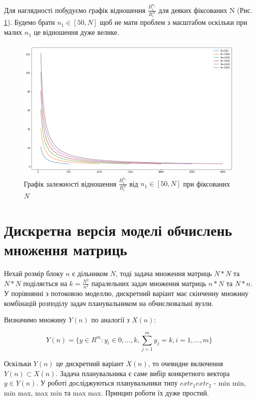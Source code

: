 Для наглядності побудуємо графік відношення $\frac{B_i^{n_1}}{B_i^{N}}$ для деяких фіксованих N (Рис. \ref{fig:frac_from_n}). Будемо брати $n_1 \in [50, N]$ щоб не мати проблем з масштабом оскільки при малих $n_1$ це відношення дуже велике.

\begin{figure}[H]
	\centering
	\includegraphics[width=\textwidth]{theory/img/B_times_diff_N}
	\caption{Графік залежності відношення $\frac{B_i^{n_1}}{B_i^{N}}$ від $n_1 \in [50, N]$ при фіксованих $N$ }
	\label{fig:frac_from_n}
\end{figure}

\section{Дискретна версія моделі обчислень множення матриць}
Нехай розмір блоку $n$ є дільником $N$, тоді задача множення матриць $N*N$ та $N*N$ поділяється на $k = \frac{N^2}{n^2}$ паралельних задач множення матриць $n*N$ та $N*n$.
У порівнянні з потоковою моделлю, дискретний варіант має скінченну множину комбінацій розподілу задач планувальником на обчислювальні вузли.

Визначимо множину $Y(n)$ по аналогії з $X(n)$:

\begin{equation}
	\label{eq:Y(n)}
	Y(n) = \big\{y \in R^m : y_i \in {0, \ldots, k}, \sum_{j = 1}^{m} y_j = k, i = 1,\ldots,m \big\}
\end{equation}

Оскільки $Y(n)$ це дискретний варіант $X(n)$, то очевидне включення $Y(n) \subset X(n)$.
Задача планувальника є саме вибір конкретного вектора $y \in Y(n)$.
У роботі досліджуються планувальники типу $extr_1 extr_2$ - min min, min max, max min та max max. Принцип роботи їх дуже простий.

